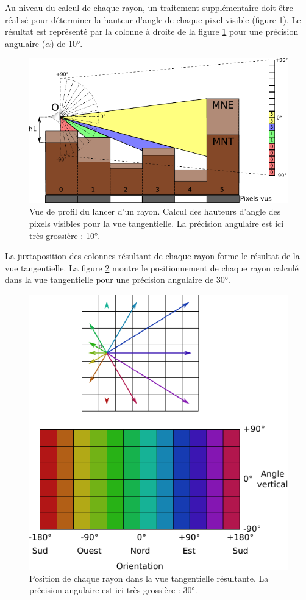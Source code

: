\documentclass{report}
\begin{document}
Au niveau du calcul de chaque rayon, un traitement supplémentaire doit être réalisé pour déterminer la hauteur d'angle de chaque pixel visible (figure \ref{ray_side_tan}). Le résultat est représenté par la colonne à droite de la figure \ref{ray_side_tan} pour une précision angulaire ($\alpha$) de 10°.

\begin{figure}[H]
	\includegraphics{img/ray_side_tan-fr.pdf} 
	\caption{Vue de profil du lancer d'un rayon. Calcul des hauteurs d'angle des pixels visibles pour la vue tangentielle. La précision angulaire est ici très grossière : 10°.}
	\label{ray_side_tan}
\end{figure}

La juxtaposition des colonnes résultant de chaque rayon forme le résultat de la vue tangentielle. La figure \ref{grid_tan_result} montre le positionnement de chaque rayon calculé dans la vue tangentielle pour une précision angulaire de 30°.

\begin{figure}[H]
	\includegraphics{img/grid_tan_result.pdf} 
	\caption{Position de chaque rayon dans la vue tangentielle résultante. La précision angulaire est ici très grossière : 30°.}
	\label{grid_tan_result}
\end{figure}
\end{document}
